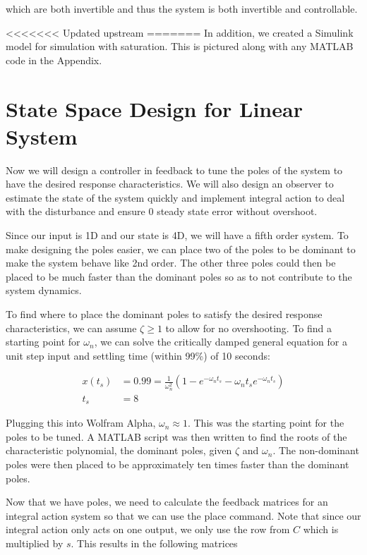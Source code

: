 \documentclass[10pt]{article}
\begin{document}
which are both invertible and thus the system is both invertible and controllable.

<<<<<<< Updated upstream
=======
In addition, we created a Simulink model for simulation with saturation. This is pictured along with any MATLAB code in the Appendix.

\section{State Space Design for Linear System}

Now we will design a controller in feedback to tune the poles of the system to have the desired response characteristics. We will also design an observer to estimate the state of the system quickly and implement integral action to deal with the disturbance and ensure 0 steady state error without overshoot.

Since our input is 1D and our state is 4D, we will have a fifth order system. To make designing the poles easier, we can place two of the poles to be dominant to make the system behave like 2nd order. The other three poles could then be placed to be much faster than the dominant poles so as to not contribute to the system dynamics.

To find where to place the dominant poles to satisfy the desired response characteristics, we can assume $\zeta \ge 1$ to allow for no overshooting. To find a starting point for $\omega_n$, we can solve the critically damped general equation for a unit step input and settling time (within 99\%) of 10 seconds:

\begin{align*}
    x(t_s) &= 0.99 = \frac{1}{\omega_n^2}(1-e^{-\omega_nt_s} - \omega_nt_se^{-\omega_nt_s}) \\
    t_s &= 8
\end{align*}

Plugging this into Wolfram Alpha, $\omega_n \approx 1$. This was the starting point for the poles to be tuned. A MATLAB script was then written to find the roots of the characteristic polynomial, the dominant poles, given $\zeta$ and $\omega_n$. The non-dominant poles were then placed to be approximately ten times faster than the dominant poles.

Now that we have poles, we need to calculate the feedback matrices for an integral action system so that we can use the place command. Note that since our integral action only acts on one output, we only use the row from $C$ which is multiplied by $s$. This results in the following matrices
\end{document}
